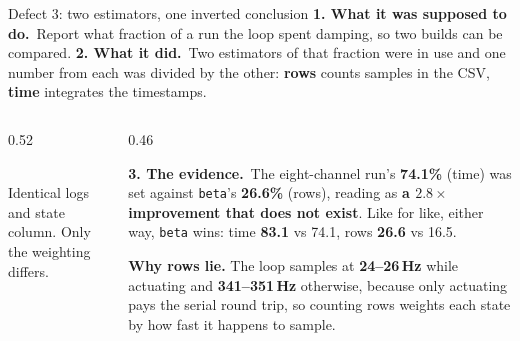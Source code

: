 \documentclass[aspectratio=169]{beamer}
\newcommand{\intended}{\textbf{1. What it was supposed to do.}}
\newcommand{\actual}{\textbf{2. What it did.}}
\newcommand{\evidence}{\textbf{3. The evidence.}}
\begin{document}
\begin{frame}{Defect 3: two estimators, one inverted conclusion}
  \footnotesize
  \intended\ Report what fraction of a run the loop spent damping, so two builds
  can be compared. \actual\ Two estimators of that fraction were in use and one
  number from each was divided by the other: \textbf{rows} counts samples in the
  CSV, \textbf{time} integrates the timestamps.

  \vspace{1mm}
  \begin{columns}[T]
    \begin{column}{0.52\textwidth}
      \centering
      \\
      {\scriptsize Identical logs and state column. Only the weighting differs.}
    \end{column}
    \begin{column}{0.46\textwidth}
      \raggedright
      \evidence\ The eight-channel run's \textbf{74.1\%} (time) was set against
      \texttt{beta}'s \textbf{26.6\%} (rows), reading as \alert{\textbf{a
      $2.8\times$ improvement that does not exist}}. Like for like, either way,
      \texttt{beta} wins: time \textbf{83.1} vs 74.1, rows \textbf{26.6} vs
      16.5.

      \vspace{1.5mm}
      \textbf{Why rows lie.} The loop samples at \textbf{24--26\,Hz} while
      actuating and \textbf{341--351\,Hz} otherwise, because only actuating pays
      the serial round trip, so counting rows weights each state by how fast it
      happens to sample.


\end{column}
\end{columns}
\end{frame}
\end{document}
